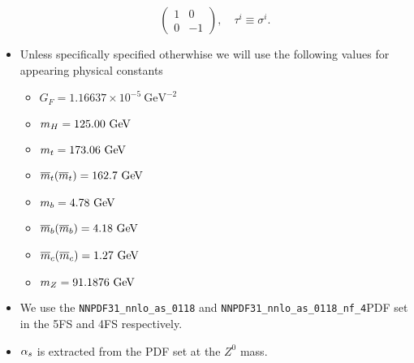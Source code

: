 \begin{itemize}
\begin{equation}
\begin{pmatrix}
                1 & 0 \\
                0 & -1
            \end{pmatrix}, \quad \tau^i \equiv \sigma^i.
        \end{equation}
        \item Unless specifically specified otherwhise we will use the following values for appearing physical constants
        \begin{itemize}
        \item $G_F =  1.16637 \times 10^{-5}\ \text{GeV}^{-2}$
        \item $m_H = 125.00 \ \text{GeV}$
        \item $m_t = 173.06 \ \text{GeV}$
        \item $\msMass{t} = 162.7 \ \GeV$
        \item $m_b = 4.78 \ \text{GeV}$
        \item $\msMass{b} = 4.18 \ \GeV$
        \item $\msMass{c} =  1.27\ \GeV$
        \item $m_Z = 91.1876 \ \text{GeV}$
        \end{itemize}
        \item We use the \texttt{NNPDF31\_nnlo\_as\_0118} and \texttt{NNPDF31\_nnlo\_as\_0118\_nf\_4}\acs{PDF} set in the 5\acs{FS} and 4\acs{FS} respectively.
        \item $\alpha_s$ is extracted from the \acs{PDF} set at the $Z^0$ mass.
    \end{itemize}


\endgroup
